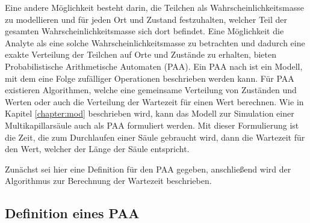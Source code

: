 Eine andere Möglichkeit besteht darin, die Teilchen als Wahrscheinlichkeitsmasse zu modellieren und für jeden Ort und Zustand festzuhalten, welcher Teil der gesamten Wahrscheinlichkeitsmasse sich dort befindet.
Eine Möglichkeit die Analyte als eine solche Wahrscheinlichkeitsmasse zu betrachten und dadurch eine exakte Verteilung der Teilchen auf Orte und Zustände zu erhalten, bieten Probabilistische Arithmetische Automaten (PAA).
Ein PAA nach \cite{MHKR} ist ein Modell, mit dem eine Folge zufälliger Operationen beschrieben werden kann. 
Für PAA existieren Algorithmen, welche eine gemeinsame Verteilung von Zuständen und Werten oder auch die Verteilung der Wartezeit für einen Wert berechnen. Wie in Kapitel \ref{chapter:mod} beschrieben wird, kann das Modell zur Simulation einer Multikapillarsäule auch als PAA formuliert werden. Mit dieser Formulierung ist die Zeit, die zum Durchlaufen einer Säule gebraucht wird, dann die Wartezeit für den Wert, welcher der Länge der Säule entspricht. %

Zunächst sei hier eine Definition für den PAA gegeben, anschließend wird der Algorithmus zur Berechnung der Wartezeit beschrieben.

\subsection{Definition eines PAA}

